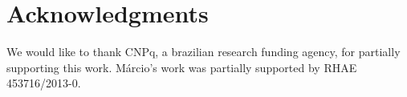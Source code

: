 \documentclass[review]{elsarticle}
\begin{document}
\linenumbers













\section{Acknowledgments}

We would like to thank CNPq, a brazilian research funding agency, for partially supporting this work. M\'{a}rcio's work was partially supported by RHAE 453716/2013-0.



\end{document}
